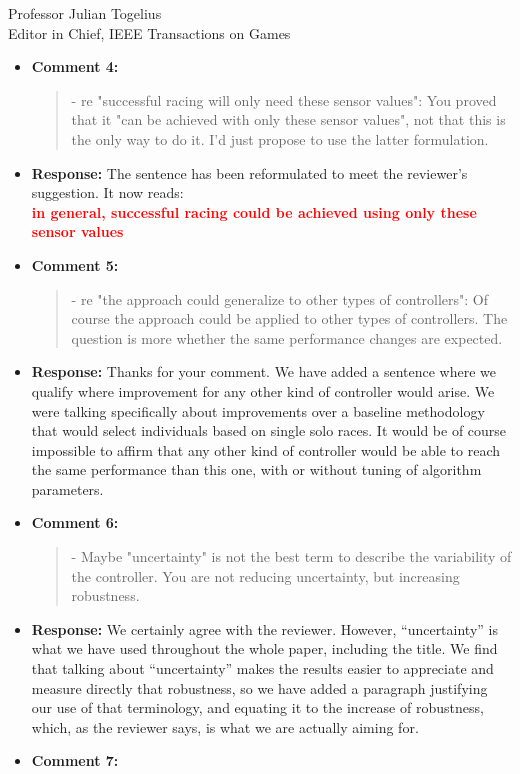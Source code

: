 \documentclass[10pt]{letter} %
\begin{document}
\begin{letter}{Professor Julian Togelius \\ Editor in Chief, IEEE Transactions on Games}
\begin{enumerate}
\begin{itemize}
			\item {\bf Comment 4:}
				\begin{quote}	
					- re "successful racing will only need these sensor values": You proved that it "can be achieved with only these sensor values", not that this is the only way to do it. I'd just propose to use the latter formulation.
				\end{quote}	
			\item{\bf Response:} 
				The sentence has been reformulated to meet the reviewer's suggestion. It now reads:\\
			 \textcolor{red}{	{\bf in general, successful racing could be achieved using only these sensor values} }
			\item {\bf Comment 5:}
				\begin{quote}	
					- re "the approach could generalize to other types of controllers": Of course the approach could be applied to other types of controllers. The question is more whether the same performance changes are expected.
				\end{quote}	
			\item {\bf Response:} 
Thanks for your comment. We have added a sentence where we qualify where improvement for any other kind of controller would arise. We were talking specifically about improvements over a baseline methodology that would select
individuals based on single solo races. It would be of course
impossible to affirm that any other kind of controller would be able
to reach the same performance than this one, with or without tuning of
algorithm parameters.
			\item {\bf Comment 6:}
				\begin{quote}	
					- Maybe "uncertainty" is not the best term to describe the variability of the controller. You are not reducing uncertainty, but increasing robustness.
				\end{quote}
			\item {\bf Response:}
We certainly agree with the reviewer. However, ``uncertainty'' is what
we have used throughout the whole paper, including the title. We find
that talking about ``uncertainty'' makes the results easier to appreciate and measure directly that robustness, so we have added a paragraph justifying our use of that terminology, and equating it to the increase of robustness, which, as the reviewer says, is what we are actually aiming for.
			\item {\bf Comment 7:}
				\begin{quote}	

\end{quote}
\end{itemize}
\end{enumerate}
\end{letter}
\end{document}
